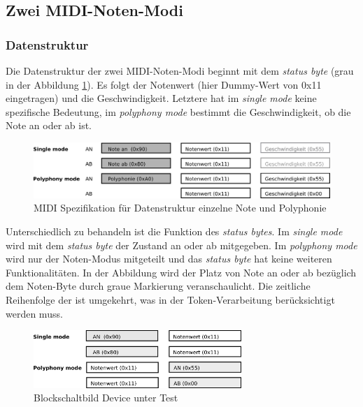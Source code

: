 \subsection{Zwei MIDI-Noten-Modi}\label{note_modes}

\subsubsection{Datenstruktur}

Die Datenstruktur der zwei MIDI-Noten-Modi beginnt mit dem \textit{status byte} (grau in der Abbildung \ref{fig.testbench_single_Mode}). Es folgt der Notenwert (hier Dummy-Wert von 0x11 eingetragen) und die Geschwindigkeit. Letztere hat im \textit{single mode} keine spezifische Bedeutung, im \textit{polyphony mode} bestimmt die Geschwindigkeit, ob die Note an oder ab ist.

\begin{figure}[H]
	\includegraphics[width=1\textwidth]{images/midi_interface/MIDI_Spezifikation.png}
	\caption{MIDI Spezifikation für Datenstruktur einzelne Note und Polyphonie}
	\label{fig.testbench_single_Mode}
\end{figure}

Unterschiedlich zu behandeln ist die Funktion des \textit{status bytes}. Im \textit{single mode} wird mit dem \textit{status byte} der Zustand an oder ab mitgegeben. Im \textit{polyphony mode} wird nur der Noten-Modus mitgeteilt und das \textit{status byte} hat keine weiteren Funktionalitäten. In der Abbildung wird der Platz von Note an oder ab bezüglich dem Noten-Byte durch graue Markierung veranschaulicht. Die zeitliche Reihenfolge der ist umgekehrt, was in der Token-Verarbeitung berücksichtigt werden muss.

\begin{figure}[H]
	\includegraphics[width=0.7\textwidth]{images/midi_interface/MIDI_Spezifikation_Datenfolge.png}
	\caption{Blockschaltbild Device unter Test}
	\label{fig.testbench_polypphon_mode}
\end{figure}

